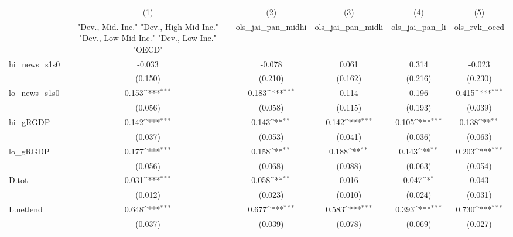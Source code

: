 {
\def\sym#1{\ifmmode^{#1}\else\(^{#1}\)\fi}
\begin{tabular}{l*{5}{c}}
\toprule
            &\multicolumn{1}{c}{(1)}&\multicolumn{1}{c}{(2)}&\multicolumn{1}{c}{(3)}&\multicolumn{1}{c}{(4)}&\multicolumn{1}{c}{(5)}\\
            &\multicolumn{1}{c}{ "Dev., Mid.-Inc." "Dev., High Mid-Inc." "Dev., Low Mid-Inc." "Dev., Low-Inc." "OECD" }&\multicolumn{1}{c}{ols\_jai\_pan\_midhi}&\multicolumn{1}{c}{ols\_jai\_pan\_midli}&\multicolumn{1}{c}{ols\_jai\_pan\_li}&\multicolumn{1}{c}{ols\_rvk\_oecd}\\
\midrule
hi\_news\_s1s0&      -0.033         &      -0.078         &       0.061         &       0.314         &      -0.023         \\
            &     (0.150)         &     (0.210)         &     (0.162)         &     (0.216)         &     (0.230)         \\
\addlinespace
lo\_news\_s1s0&       0.153\sym{***}&       0.183\sym{***}&       0.114         &       0.196         &       0.415\sym{***}\\
            &     (0.056)         &     (0.058)         &     (0.115)         &     (0.193)         &     (0.039)         \\
\addlinespace
hi\_gRGDP    &       0.142\sym{***}&       0.143\sym{**} &       0.142\sym{***}&       0.105\sym{***}&       0.138\sym{**} \\
            &     (0.037)         &     (0.053)         &     (0.041)         &     (0.036)         &     (0.063)         \\
\addlinespace
lo\_gRGDP    &       0.177\sym{***}&       0.158\sym{**} &       0.188\sym{**} &       0.143\sym{**} &       0.203\sym{***}\\
            &     (0.056)         &     (0.068)         &     (0.088)         &     (0.063)         &     (0.054)         \\
\addlinespace
D.tot       &       0.031\sym{***}&       0.058\sym{**} &       0.016         &       0.047\sym{*}  &       0.043         \\
            &     (0.012)         &     (0.023)         &     (0.010)         &     (0.024)         &     (0.031)         \\
\addlinespace
L.netlend   &       0.648\sym{***}&       0.677\sym{***}&       0.583\sym{***}&       0.393\sym{***}&       0.730\sym{***}\\
            &     (0.037)         &     (0.039)         &     (0.078)         &     (0.069)         &     (0.027)         \\

\end{tabular}}
